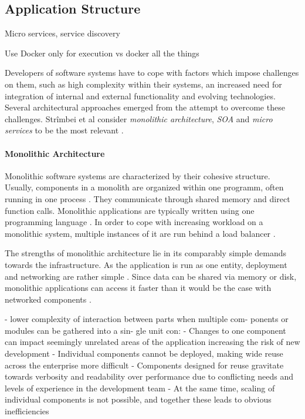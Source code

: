 

\subsection{Application Structure} %
  \label{sub:application_architecture}
  Micro services, service discovery \cite{Stubbs2015Distributed}

  Use Docker only for execution vs docker all the things

  Developers of software systems have to cope with factors which impose challenges on them, such as high complexity within their systems, an increased need for integration of internal and external functionality and evolving technologies. Several architectural approaches emerged from the attempt to overcome these challenges. Strîmbei et al consider \emph{monolithic architecture}, \emph{\ac{SOA}} and \emph{micro services} to be the most relevant \cite[p.~13]{Strimbei2015Software}.

  \paragraph{Monolithic Architecture} %
  \label{par:monolithic_architecture}
    Monolithic software systems are characterized by their cohesive structure. Usually, components in a monolith are organized within one programm, often running in one process \cite[p.~35]{Stubbs2015Distributed}. They communicate through shared memory and direct function calls. Monolithic applications are typically written using one programming language \cite[p.~14]{Strimbei2015Software}. In order to cope with increasing workload on a monolithic system, multiple instances of it are run behind a load balancer \cite[p.~35]{Stubbs2015Distributed}.

    The strengths of monolithic architecture lie in its comparably simple demands towards the infrastructure. As the application is run as one entity, deployment and networking are rather simple \cite[p.~35]{Stubbs2015Distributed}. Since data can be shared via memory or disk, monolithic applications can access it faster than it would be the case with networked components \cite[p.~14]{Strimbei2015Software}.

      - lower complexity of interaction between parts when multiple com- ponents or modules can be gathered into a sin- gle unit \cite[p.~14]{Strimbei2015Software}
    con:
      - Changes to one component can impact seemingly unrelated areas of the application increasing the risk of new development  \cite{Stubbs2015Distributed}
      - Individual components cannot be deployed, making wide reuse across the enterprise more difficult  \cite{Stubbs2015Distributed}
      - Components designed for reuse gravitate towards verbosity and readability over performance due to  conflicting needs and levels of experience in the development team  \cite{Stubbs2015Distributed}
      - At the same time, scaling of individual components is not possible, and together these leads to obvious inefficiencies \cite{Stubbs2015Distributed}

